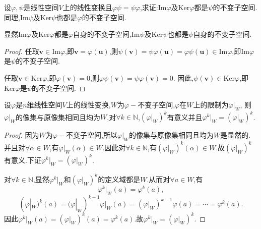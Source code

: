 \documentclass[../../main.tex]{subfiles}%
\begin{document}
\begin{proposition}\label{proposition:乘法可交换的线性变换值域和核互为不变子空间}
设\(\varphi,\psi\)是线性空间\(V\)上的线性变换且\(\varphi\psi = \psi\varphi\),求证:\(\text{Im}\varphi\)及\(\text{Ker}\varphi\)都是\(\psi\)的不变子空间.同理,\(\text{Im}\psi\)及\(\text{Ker}\psi\)也都是\(\varphi\)的不变子空间.
\end{proposition}
\begin{note}
显然\(\text{Im}\varphi\)及\(\text{Ker}\varphi\)都是\(\varphi\)自身的不变子空间,\(\text{Im}\psi\)及\(\text{Ker}\psi\)也都是\(\psi\)自身的不变子空间.
\end{note}
\begin{proof}

任取\(\boldsymbol{v}\in\text{Im}\varphi\),即\(\boldsymbol{v}=\varphi(\boldsymbol{u})\),则\(\psi(\boldsymbol{v})=\psi\varphi(\boldsymbol{u})=\varphi\psi(\boldsymbol{u})\in\text{Im}\varphi\),即\(\text{Im}\varphi\)是\(\psi\)的不变子空间.

任取\(\boldsymbol{v}\in\text{Ker}\varphi\),即\(\varphi(\boldsymbol{v}) = 0\),则\(\varphi\psi(\boldsymbol{v})=\psi\varphi(\boldsymbol{v}) = 0\). 因此,\(\psi(\boldsymbol{v})\in\text{Ker}\varphi\),即\(\text{Ker}\varphi\)是\(\psi\)的不变子空间.

\end{proof}

\begin{proposition}\label{proposition:线性变换在其不变子空间下的限制}
设\(\varphi\)是\(n\)维线性空间\(V\)上的线性变换,\(W\)为\(\varphi -\)不变子空间,\(\varphi\)在\(W\)上的限制为\(\varphi|_W\),
则\(\varphi|_W\)的像集与原像集相同且均为\(W\),对\(\forall k\in \mathbb{N}\),\((\varphi|_W)^k\)有意义并且\(\varphi^k|_W = (\varphi|_W)^k\).    
\end{proposition}
\begin{proof}

因为\(W\)为\(\varphi -\)不变子空间,所以\(\varphi|_W\)的像集与原像集相同且均为\(W\)是显然的.
并且对\(\forall \alpha \in W\),有\(\varphi|_W(\alpha) \in W\).因此对\(\forall k \in \mathbb{N}\),有\((\varphi|_W)^k(\alpha) \in W\).故\((\varphi|_W)^k\)有意义.下证\(\varphi^k|_W = (\varphi|_W)^k\).

对\(\forall k\in \mathbb{N}\),显然\(\varphi^k|_W\)和\((\varphi|_W)^k\)的定义域都是\(W\).从而对\(\forall a\in W\),有
\[
\varphi^k|_W(a)=\varphi^k(a),
\]
\[
(\varphi|_W)^k(a)=(\varphi|_W)^{k - 1}\varphi|_W(a)=(\varphi|_W)^{k - 1}\varphi(a)=\cdots=\varphi^k(a).
\]
因此\(\varphi^k|_W(a)=(\varphi|_W)^k(a)=\varphi^k(a)\).故\(\varphi^k|_W = (\varphi|_W)^k\).

\end{proof}
\end{document}
